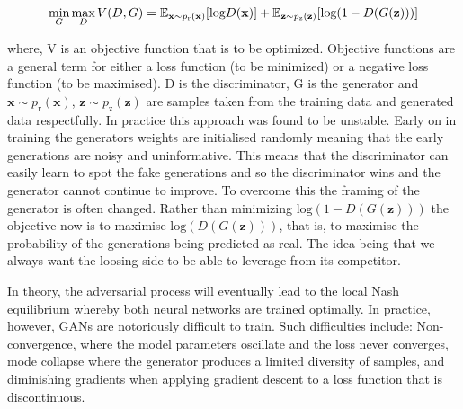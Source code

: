 \documentclass[12pt]{iopart}
\newcommand{\chris}[1]{\textbf{\textcolor{green}{CHRIS: #1}}}
\begin{document}

%
\begin{equation}
\mathop{\text{min}}_{G}  \mathop{\text{max}}_{D} V(D,G) = \mathbb{E}_{\mathbf{x} \sim p_{\text{r}}(\mathbf{x})} [\text{log} D(\mathbf{x})] \\ + \mathbb{E}_{\mathbf{z} \sim p_{\text{z}}(\mathbf{z})} [\text{log}(1-D(G(\mathbf{z})))]
\label{equation:GANloss}
\end{equation}

where, V is an objective function that is to be optimized. Objective functions are a general term for either a loss function (to be minimized) or a negative loss function (to be maximised). D is the discriminator, G is the generator and ${\mathbf{x} \sim p_{\text{r}}(\mathbf{x})}$, ${\mathbf{z} \sim p_{\text{z}}(\mathbf{z})}$ are samples taken from the training data and generated data respectfully. In practice this approach was found to be unstable. Early on in training the generators weights are initialised randomly meaning that the early generations are noisy and uninformative. This means that the discriminator can easily learn to spot the fake generations and so the discriminator wins and the generator cannot continue to improve. To overcome this the framing of the generator is often changed. Rather than minimizing $\text{log}(1-D(G(\mathbf{z})))$ the objective now is to maximise $\text{log}(D(G(\mathbf{z})))$, that is, to maximise the probability of the generations being predicted as real. The idea being that we always want the loosing side to be able to leverage from its competitor. 
%

%
In theory, the adversarial process will eventually lead to the local Nash
equilibrium \cite{Nash1950} whereby both neural networks are trained
optimally. In practice, however, \acp{GAN} are notoriously difficult
to train. Such difficulties include: Non-convergence, where the model
parameters oscillate and the loss never converges, mode collapse where the generator produces a
limited diversity of samples, and diminishing
gradients when applying gradient descent to a loss function that is discontinuous.
\end{document}
